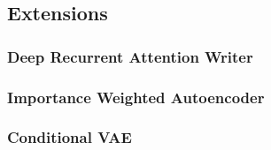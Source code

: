 \subsection{Extensions}
\label{sub:vae_extensions}

\subsubsection{Deep Recurrent Attention Writer}
\label{ssub:vae_deep_recurrent_attention_writer}

\subsubsection{Importance Weighted Autoencoder}
\label{ssub:vae_importance_weighted_autoencoder}

\subsubsection{Conditional VAE}
\label{ssub:vae_conditional_vae}
